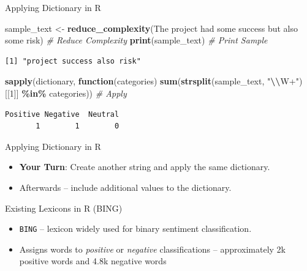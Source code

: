 \documentclass[
  ignorenonframetext,
  aspectratio=169]{beamer}
\newenvironment{Shaded}{\begin{snugshade}}{\end{snugshade}}
\newcommand{\CommentTok}[1]{\textcolor[rgb]{0.56,0.35,0.01}{\textit{#1}}}
\newcommand{\ControlFlowTok}[1]{\textcolor[rgb]{0.13,0.29,0.53}{\textbf{#1}}}
\newcommand{\DecValTok}[1]{\textcolor[rgb]{0.00,0.00,0.81}{#1}}
\newcommand{\FunctionTok}[1]{\textcolor[rgb]{0.13,0.29,0.53}{\textbf{#1}}}
\newcommand{\NormalTok}[1]{#1}
\newcommand{\OtherTok}[1]{\textcolor[rgb]{0.56,0.35,0.01}{#1}}
\newcommand{\SpecialCharTok}[1]{\textcolor[rgb]{0.81,0.36,0.00}{\textbf{#1}}}
\newcommand{\StringTok}[1]{\textcolor[rgb]{0.31,0.60,0.02}{#1}}
\begin{document}
\begin{frame}[fragile]{Applying Dictionary in R}
\label{applying-dictionary-in-r}
\scriptsize

\begin{Shaded}
\begin{Highlighting}[]
\NormalTok{sample\_text }\OtherTok{\textless{}{-}} \FunctionTok{reduce\_complexity}\NormalTok{(}\StringTok{\textquotesingle{}The project had some success but also some risk\textquotesingle{}}\NormalTok{) }\CommentTok{\# Reduce Complexity}
\FunctionTok{print}\NormalTok{(sample\_text) }\CommentTok{\# Print Sample}
\end{Highlighting}
\end{Shaded}

\begin{verbatim}
[1] "project success also risk"
\end{verbatim}

\begin{Shaded}
\begin{Highlighting}[]
\FunctionTok{sapply}\NormalTok{(dictionary, }\ControlFlowTok{function}\NormalTok{(categories) }\FunctionTok{sum}\NormalTok{(}\FunctionTok{strsplit}\NormalTok{(sample\_text, }\StringTok{"}\SpecialCharTok{\textbackslash{}\textbackslash{}}\StringTok{W+"}\NormalTok{)[[}\DecValTok{1}\NormalTok{]] }\SpecialCharTok{\%in\%}\NormalTok{ categories)) }\CommentTok{\# Apply }
\end{Highlighting}
\end{Shaded}

\begin{verbatim}
Positive Negative  Neutral 
       1        1        0 
\end{verbatim}
\end{frame}

\begin{frame}{Applying Dictionary in R}
\label{applying-dictionary-in-r-1}
\begin{itemize}
\item \textbf{Your Turn}: Create another string and apply the same dictionary. 
\item Afterwards -- include additional values to the dictionary. 
\end{itemize}
\end{frame}

\begin{frame}{Existing Lexicons in R (BING)}
\label{existing-lexicons-in-r-bing}
\begin{itemize}
\item \texttt{BING} -- lexicon widely used for binary sentiment classification. \par \vspace{2.5mm}
\item Assigns words to \textit{positive} or \textit{negative} classifications -- approximately 2k positive words and 4.8k negative words
\end{itemize}
\end{frame}
\end{document}
